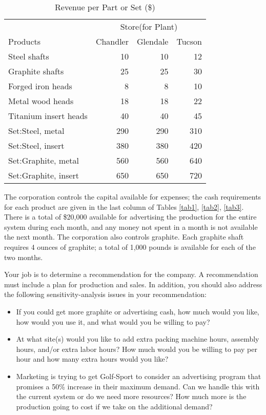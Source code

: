 \documentclass[12pt]{article}
\begin{document}
			\begin{table}[H]
				\centering
				\setlength{\belowcaptionskip}{0.1cm} 
				\caption{Revenue per Part or Set (\$) } 
				\label{tab7}
				\begin{tabular}{lrrr}
					\hline
					\hline
				 & \multicolumn{3}{c}{Store(for Plant)} \\
				Products&Chandler  &  Glendale  &  Tucson    \\\hline
				Steel shafts& 10&10&12\\
				Graphite shafts& 25&25&30\\
				Forged iron heads&8&8&10\\
				Metal wood heads&18&18&22\\
				Titanium insert heads&40&40&45\\
				Set:Steel, metal&290&290&310\\
				Set:Steel, insert&380&380&420\\
				Set:Graphite, metal&560&560&640\\
				Set:Graphite, insert&650&650&720\\
				\hline
				\hline  
				\end{tabular}
				\end{table}

		\noindent The corporation controls the capital available for expenses; the cash requirements for each product are given in the last column of Tables \ref{tab1}, \ref{tab2}, \ref{tab3}. There is a total of \$20,000 available for advertising the production for the entire system during each month, and any money not spent in a month is not available the next month. The corporation also controls graphite. Each graphite shaft requires 4 ounces of graphite; a total of 1,000 pounds is available for each of the two months.

		\noindent Your job is to determine a recommendation for the company. A recommendation must include a plan for production and sales. In addition, you should also address the following sensitivity-analysis issues in your recommendation:
		\begin{itemize}
			\item If you could get more graphite or advertising cash, how much would you like, how would you use it, and what would you be willing to pay?
			\item At what site(s) would you like to add extra packing machine hours, assembly hours, and/or extra labor hours? How much would you be willing to pay per hour and how many extra hours would you like?
			\item Marketing is trying to get Golf-Sport to consider an advertising program that promises a 50\% increase in their maximum demand. Can we handle this with the current system or do we need more resources? How much more is the production going to cost if we take on the additional demand?
		\end{itemize}
	
\end{document}
